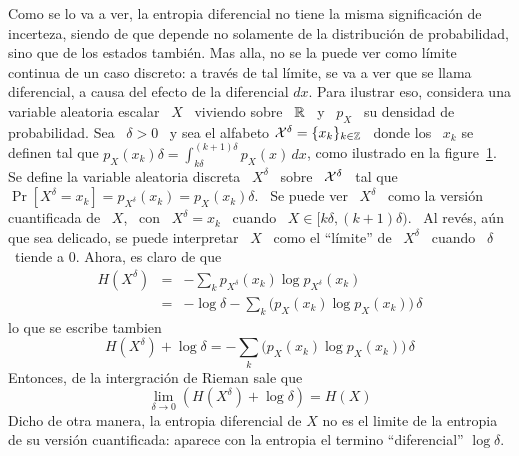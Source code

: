 Como se lo  va a ver, la entropia diferencial no  tiene la misma significaci\'on
de  incerteza,  siendo de  que  depende no  solamente  de  la distribuci\'on  de
probabilidad, sino que  de los estados tambi\'en.  Mas alla, no  se la puede ver
como l\'imite continua de un caso discreto:  a trav\'es de tal l\'imite, se va a
ver que se  llama diferencial, a causa del efecto de  la diferencial $dx$.  Para
ilustrar eso, considera una variable aleatoria  escalar \ $X$ \ viviendo sobre \
$\mathbb{R}$ \ y \  $p_X$ \ su densidad de probabilidad.  Sea \ $\delta  > 0$ \ y sea
el alfabeto $\mathcal{X}^\delta = \{ x_k \}_{k \in \mathbb{Z}}$ \ donde los \ $x_k$ se definen
tal que  $\displaystyle p_X(x_k) \delta = \int_{k  \delta}^{(k+1) \delta} p_X(x)
\, dx$, como ilustrado  en la figure~\ref{fig:SZ:CuantificacionX}.  Se define la
variable  aleatoria discreta  \ $X^\delta$  \ sobre  \ $\mathcal{X}^\delta$  \ tal  que \
$\Pr[X^\delta =  x_k] = p_{X^\delta}(x_k) =  p_X(x_k) \delta$. \ Se  puede ver \
$X^\delta$ \ como la versi\'on cuantificada de \ $X$, \ con \ $X^\delta = x_k$ \
cuando  \ $X \in  [k \delta  , (k+1)  \delta )$.   \ Al  rev\'es, a\'un  que sea
delicado, se  puede interpretar \ $X$ \  como el ``l\'imite'' de  \ $X^\delta$ \
cuando \ $\delta$ \ tiende a 0. Ahora, es claro de que
%
\begin{eqnarray*}
H(X^\delta) & = & - \sum_k p_{X^\delta}(x_k) \log p_{X^\delta}(x_k)\\[2.5mm]
%
& = & - \log \delta - \sum_k \Big( p_X(x_k) \log p_X(x_k) \Big) \, \delta
\end{eqnarray*}
%
lo que se escribe tambien
%
\[
H(X^\delta)  + \log  \delta =  - \sum_k  \Big( p_X(x_k)  \log p_X(x_k)  \Big) \,
\delta
\]
%
Entonces, de la intergraci\'on de Rieman sale que
%
\[
\lim_{\delta \to 0} \left( H(X^\delta) + \log \delta \right) = H(X)
\]
%
Dicho de  otra manera,  la entropia  diferencial de $X$  no es  el limite  de la
entropia  de su  versi\'on  cuantificada:  aparece con  la  entropia el  termino
``diferencial'' $\log \delta$.
%
\begin{figure}[h!]
%
\begin{center}  \end{center}
%
%
\label{fig:SZ:CuantificacionX}
\end{figure}
%

